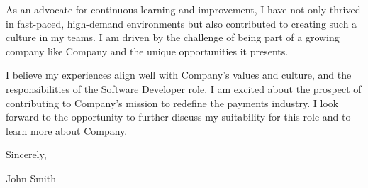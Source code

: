 \documentclass[letterpaper]{resume_config}
\begin{document}
\bigskip

As an advocate for continuous learning and improvement, I have not only thrived in fast-paced, high-demand environments but also contributed to creating such a culture in my teams. I am driven by the challenge of being part of a growing company like Company and the unique opportunities it presents.

\bigskip

I believe my experiences align well with Company's values and culture, and the responsibilities of the Software Developer role. I am excited about the prospect of contributing to Company's mission to redefine the payments industry. I look forward to the opportunity to further discuss my suitability for this role and to learn more about Company.

\bigskip
Sincerely,

John Smith
\end{document}
